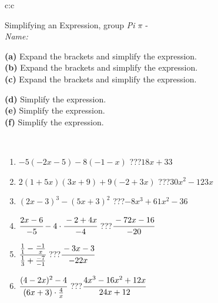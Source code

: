 \documentclass[10pt]{report}
\begin{document}
\newpage
\thispagestyle{empty}
\begin{tabular}{c:c}
\begin{minipage}[c][104.5mm][t]{0.5\linewidth}
\begin{center}
\vspace{7mm}
{\huge Simplifying an Expression, group \textit{Pi $\pi$} -}\\[5mm]
\textit{Name:}\phantom{xxxxxxxxxxxxxxxxxxxxxxxxxxxxxxxxxxxxxxxxxxxxxxxxxxxxxxxxxxxxxxxxx}\\[5mm]
\begin{minipage}{0.95\linewidth}
\begin{center}
{\small \begin{minipage}{0.6\textwidth}
\textbf{(a)} Expand the brackets and simplify the expression. \\[1mm]
\textbf{(b)} Expand the brackets and simplify the expression. \\[1mm]
\textbf{(c)} Expand the brackets and simplify the expression.
\end{minipage} \begin{minipage}{0.39\textwidth}
\textbf{(d)} Simplify the expression. \\[1mm]
\textbf{(e)} Simplify the expression. \\[1mm]
\textbf{(f)} Simplify the expression.
\end{minipage}
}
\end{center}
\end{minipage}
\\[4mm]
\begin{minipage}{0.79\linewidth}
\begin{center}
\begin{varwidth}{\linewidth}
\begin{enumerate}
\normalsize
\item $-5(-2x-5)-8(-1-x)$\quad \dotfill\; ???\;\dotfill \quad $18x+33$
\item $2(1+5x)(3x+9)+9(-2+3x)$\quad \dotfill\; ???\;\dotfill \quad $30x^2-123x$
\item $(2x-3)^3-(5x+3)^2$\quad \dotfill\; ???\;\dotfill \quad $-8x^3+61x^2-36$
\item $\cfrac{2x-6}{-5}-4\cdot\cfrac{-2+4x}{-4}$\quad \dotfill\; ???\;\dotfill \quad $\cfrac{-72x-16}{-20}$
\item $\cfrac{\frac{1}{1}-\frac{-1}{x}}{\frac{1}{3}+\frac{-7}{-1}}$\quad \dotfill\; ???\;\dotfill \quad $\cfrac{-3x-3}{-22x}$
\item $\cfrac{(4-2x)^2-4}{(6x+3)\cdot\frac{4}{x}}$\quad \dotfill\; ???\;\dotfill \quad $\cfrac{4x^3-16x^2+12x}{24x+12}$

\end{enumerate}
\end{varwidth}
\end{center}
\end{minipage}
\end{center}
\end{minipage}
\end{tabular}
\end{document}
